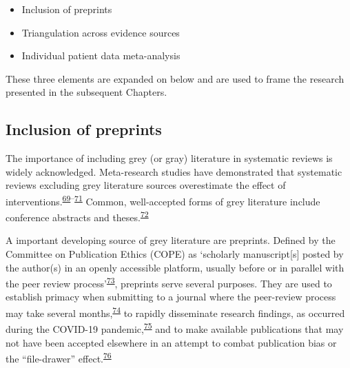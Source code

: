 \documentclass[a4paper, twoside]{templates/ociamthesis}
\providecommand{\tightlist}{%
  \setlength{\itemsep}{0pt}\setlength{\parskip}{0pt}}
\begin{document}
\begin{itemize}
\tightlist
\item
  Inclusion of preprints
\item
  Triangulation across evidence sources
\item
  Individual patient data meta-analysis
\end{itemize}

These three elements are expanded on below and are used to frame the research presented in the subsequent Chapters.

\hypertarget{diverse-sources-preprints}{%
\subsection{Inclusion of preprints}\label{diverse-sources-preprints}}

The importance of including grey (or gray) literature in systematic reviews is widely acknowledged. Meta-research studies have demonstrated that systematic reviews excluding grey literature sources overestimate the effect of interventions.\textsuperscript{\protect\hyperlink{ref-conn2003}{69}--\protect\hyperlink{ref-hopewell2007}{71}} Common, well-accepted forms of grey literature include conference abstracts and theses.\textsuperscript{\protect\hyperlink{ref-lefebvre2019searching}{72}}

A important developing source of grey literature are preprints. Defined by the Committee on Publication Ethics (COPE) as `scholarly manuscript{[}s{]} posted by the author(s) in an openly accessible platform, usually before or in parallel with the peer review process'\textsuperscript{\protect\hyperlink{ref-committeeonpublicationethicscope2018}{73}}, preprints serve several purposes. They are used to establish primacy when submitting to a journal where the peer-review process may take several months,\textsuperscript{\protect\hyperlink{ref-vale2016}{74}} to rapidly disseminate research findings, as occurred during the COVID-19 pandemic,\textsuperscript{\protect\hyperlink{ref-fraser2020preprinting}{75}} and to make available publications that may not have been accepted elsewhere in an attempt to combat publication bias or the ``file-drawer'' effect.\textsuperscript{\protect\hyperlink{ref-rosenthal1979}{76}}
\end{document}

